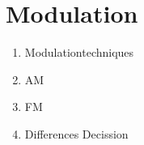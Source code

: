 \section{Modulation}

\begin{enumerate}
  \item Modulationtechniques
  \item AM
  \item FM
  \item Differences
  \subitem Decission
\end{enumerate}